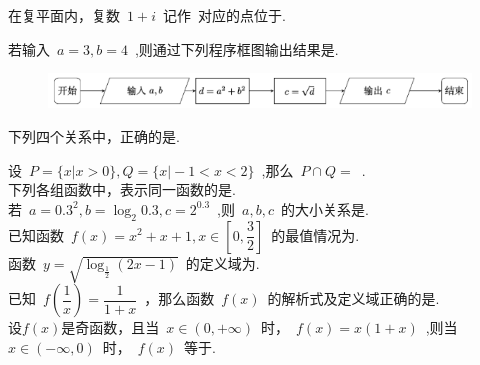 \documentclass[UTF8,printbox,a4paper]{BHCexam}
\begin{document}
\maketitle
\notice

\begin{questions}
\xuanze
\question 在复平面内，复数~$1+i$~记作~对应的点位于.\\

\question 若输入~$a=3,b=4$~,则通过下列程序框图输出结果是.\\
\begin{figure}[htp]
  \centering
  \includegraphics[scale=0.7]{liuchengtu.png}
\end{figure}

\question 下列四个关系中，正确的是.\\

\question 设~$P=\{x|x>0 \},Q=\{x|-1<x<2 \}$~,那么~$P\cap Q=$~.\\
\question 下列各组函数中，表示同一函数的是.\\
\question 若~$a=0.3 ^2,b=\log_2 0.3,c=2^{0.3}$~,则~$a,b,c$~的大小关系是.\\
\question 已知函数~$f(x)=x^2+x+1,x\in [0,\dfrac{3}{2}]$~的最值情况为.\\
\question 函数~$y=\sqrt{\log_ \frac{1}{2}{(2x-1)}}$~的定义域为.\\
\question 已知~$f(\dfrac{1}{x})=\dfrac{1}{1+x}$~，那么函数~$f(x)$~的解析式及定义域正确的是.\\
\question 设$f(x)$是奇函数，且当~$x\in (0,+\infty)$~时，~$f(x)=x(1+x)$~,则当~$x\in (-\infty,0)$~时，~$f(x)$~等于.\\


\end{questions}
\end{document}
